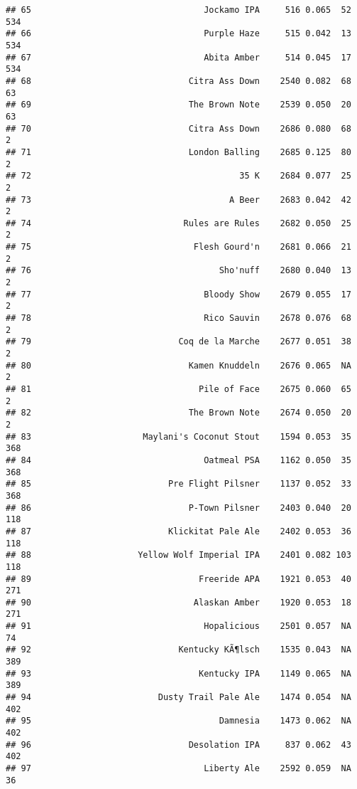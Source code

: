 \documentclass[
]{article}
\begin{document}
\begin{verbatim}
## 65                                  Jockamo IPA     516 0.065  52        534
## 66                                  Purple Haze     515 0.042  13        534
## 67                                  Abita Amber     514 0.045  17        534
## 68                               Citra Ass Down    2540 0.082  68         63
## 69                               The Brown Note    2539 0.050  20         63
## 70                               Citra Ass Down    2686 0.080  68          2
## 71                               London Balling    2685 0.125  80          2
## 72                                         35 K    2684 0.077  25          2
## 73                                       A Beer    2683 0.042  42          2
## 74                              Rules are Rules    2682 0.050  25          2
## 75                                Flesh Gourd'n    2681 0.066  21          2
## 76                                     Sho'nuff    2680 0.040  13          2
## 77                                  Bloody Show    2679 0.055  17          2
## 78                                  Rico Sauvin    2678 0.076  68          2
## 79                             Coq de la Marche    2677 0.051  38          2
## 80                               Kamen Knuddeln    2676 0.065  NA          2
## 81                                 Pile of Face    2675 0.060  65          2
## 82                               The Brown Note    2674 0.050  20          2
## 83                      Maylani's Coconut Stout    1594 0.053  35        368
## 84                                  Oatmeal PSA    1162 0.050  35        368
## 85                           Pre Flight Pilsner    1137 0.052  33        368
## 86                               P-Town Pilsner    2403 0.040  20        118
## 87                           Klickitat Pale Ale    2402 0.053  36        118
## 88                     Yellow Wolf Imperial IPA    2401 0.082 103        118
## 89                                 Freeride APA    1921 0.053  40        271
## 90                                Alaskan Amber    1920 0.053  18        271
## 91                                  Hopalicious    2501 0.057  NA         74
## 92                             Kentucky KÃ¶lsch    1535 0.043  NA        389
## 93                                 Kentucky IPA    1149 0.065  NA        389
## 94                         Dusty Trail Pale Ale    1474 0.054  NA        402
## 95                                     Damnesia    1473 0.062  NA        402
## 96                               Desolation IPA     837 0.062  43        402
## 97                                  Liberty Ale    2592 0.059  NA         36

\end{verbatim}
\end{document}
